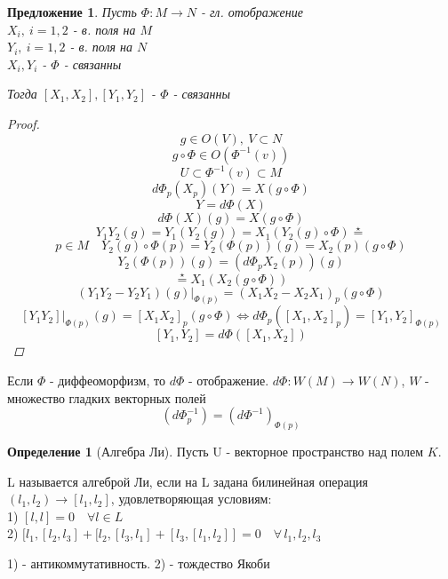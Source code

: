 \documentclass[a4paper]{article}
\newtheorem*{proposal}{Предложение}
\theoremstyle{definition}
\newtheorem*{definition}{Определение}
\begin{document}
\begin{tcolorbox}[title=$ \Phi $ - связанность коммутаторов]
    \begin{proposal}
        Пусть $ \Phi: M \to N $ - гл. отображение\\
        $ X_i, \ i = 1,2 $ - в. поля на $ M $ \\
        $ Y_i, \ i = 1,2 $ - в. поля на $ N $ \\
        $ X_i, Y_i $ - $ \Phi $ - связанны

        Тогда $ [X_1, X_2], [Y_1, Y_2] $ - $ \Phi $ - связанны

        \begin{proof}
            \[
                g \in O(V), \ V \subset N
            \]
            \[
                g \circ \Phi \in O(\Phi^{-1}(v))
            \]
            \[
                U \subset \Phi^{-1}(v) \subset M
            \]
            \[
                d\Phi_p(X_p)(Y) = X(g \circ \Phi)
            \]
            \[
                Y = d \Phi(X)
            \]
            \[
                d \Phi(X)(g) = X(g \circ \Phi)
            \]
            \[
                Y_1 Y_2(g) = Y_1(Y_2(g)) = X_1(Y_2(g) \circ \Phi) \stackrel{\star}{=}
            \]
            \[
                p \in M \quad Y_2(g) \circ \Phi(p) = Y_2(\Phi(p))(g)
                = X_2(p)(g \circ \Phi)
            \]
            \[
                Y_2(\Phi(p))(g) = (d\Phi_p X_2(p))(g)
            \]
            \[
                \stackrel{\star}{=} X_1(X_2(g \circ \Phi))
            \]
            \[
                (Y_1 Y_2 - Y_2 Y_1)(g) |_{\Phi(p)} = (X_1 X_2 - X_2 X_1)_p(g \circ \Phi)
            \]
            \[
                [Y_1 Y_2] |_{\Phi(p)}(g) = [X_1 X_2]_p (g \circ \Phi) \iff
                d \Phi_p ([X_1, X_2]_p) = [Y_1, Y_2]_{\Phi(p)}
            \]
            \[
                [Y_1, Y_2] = d \Phi([X_1, X_2])
            \]
        \end{proof}
    \end{proposal}
\end{tcolorbox}

Если $ \Phi $ - диффеоморфизм, то $ d \Phi $ - отображение.
$ d\Phi: W(M) \to W(N) $, $ W $ - множество гладких векторных полей 
\[
    (d\Phi^{-1}_p) = (d\Phi^{-1})_{\Phi(p)}
\]

\begin{tcolorbox}[title=Алгебра Ли]
    \begin{definition}[Алгебра Ли]
        Пусть U - векторное пространство над полем $ K $.

        L называется алгеброй Ли, если на L задана билинейная операция
        $ (l_1, l_2) \to [l_1, l_2] $, удовлетворяющая условиям:\\
        1) $ [l, l] = 0 \quad \forall l \in L $ \\
        2) $ [l_1, [l_2, l_3] + [l_2, [l_3, l_1] + [l_3, [l_1,l_2]] = 0 
        \quad \forall \, l_1, l_2, l_3$ 

        1) - антикоммутативность. 2) - тождество Якоби
    \end{definition}
\end{tcolorbox}
\end{document}
